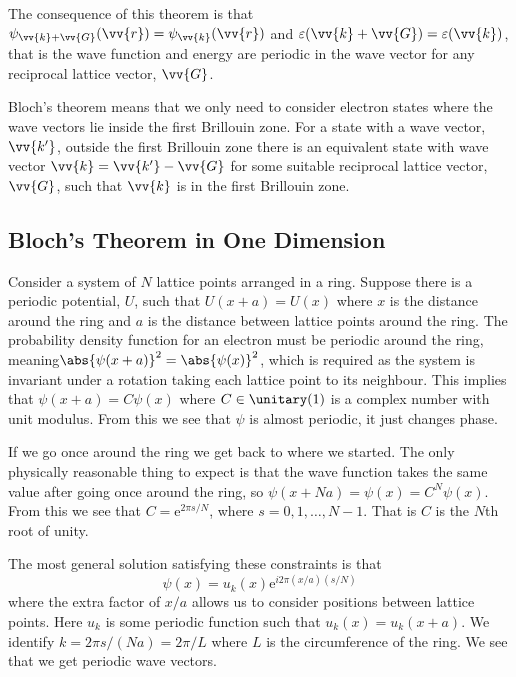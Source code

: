 \documentclass[fleqn]{NotesClass}
\newcommand*{\e}{\mathrm{e}}
\begin{document}
    The consequence of this theorem is that \(\psi_{\vv{k} + \vv{G}}(\vv{r}) = \psi_{\vv{k}}(\vv{r})\) and \(\varepsilon(\vv{k} + \vv{G}) = \varepsilon(\vv{k})\), that is the wave function and energy are periodic in the wave vector for any reciprocal lattice vector, \(\vv{G}\).
    
    Bloch's theorem means that we only need to consider electron states where the wave vectors lie inside the first Brillouin zone.
    For a state with a wave vector, \(\vv{k'}\), outside the first Brillouin zone there is an equivalent state with wave vector \(\vv{k} = \vv{k'} - \vv{G}\) for some suitable reciprocal lattice vector, \(\vv{G}\), such that \(\vv{k}\) is in the first Brillouin zone.
    
    \subsection{Bloch's Theorem in One Dimension}
    Consider a system of \(N\) lattice points arranged in a ring.
    Suppose there is a periodic potential, \(U\), such that \(U(x + a) = U(x)\) where \(x\) is the distance around the ring and \(a\) is the distance between lattice points around the ring.
    The probability density function for an electron must be periodic around the ring, meaning\(\abs{\psi(x + a)}^2 = \abs{\psi(x)}^2\), which is required as the system is invariant under a rotation taking each lattice point to its neighbour.
    This implies that \(\psi(x + a) = C\psi(x)\) where \(C \in \unitary(1)\) is a complex number with unit modulus.
    From this we see that \(\psi\) is almost periodic, it just changes phase.
    
    If we go once around the ring we get back to where we started.
    The only physically reasonable thing to expect is that the wave function takes the same value after going once around the ring, so \(\psi(x + Na) = \psi(x) = C^N\psi(x)\).
    From this we see that \(C = \e^{2\pi s/N}\), where \(s = 0, 1,\dotsc, N-1\).
    That is \(C\) is the \(N\)th root of unity.
    
    The most general solution satisfying these constraints is that
    \begin{equation}
        \psi(x) = u_{k}(x)\e^{i2\pi (x/a)(s/N)}
    \end{equation}
    where the extra factor of \(x/a\) allows us to consider positions between lattice points.
    Here \(u_k\) is some periodic function such that \(u_k(x) = u_k(x + a)\).
    We identify \(k = 2\pi s/(Na) = 2\pi/L\) where \(L\) is the circumference of the ring.
    We see that we get periodic wave vectors.
    
\end{document}
